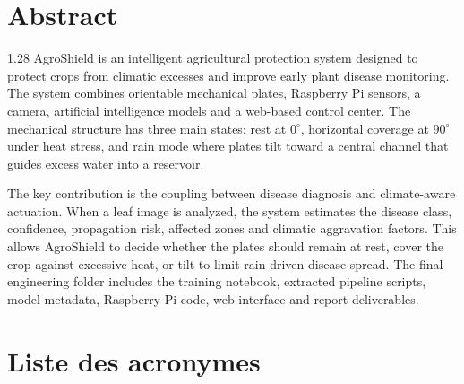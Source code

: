 ﻿\documentclass[11pt,a4paper,openany]{report}
\newenvironment{frontmattertext}
  {\begin{spacing}{1.28}\normalsize\setlength{\parskip}{10pt}}
  {\end{spacing}}
\begin{document}
\chapter*{Abstract}
\vspace{0.35cm}
\begin{frontmattertext}
AgroShield is an intelligent agricultural protection system designed to protect crops from climatic excesses and improve early plant disease monitoring. The system combines orientable mechanical plates, Raspberry Pi sensors, a camera, artificial intelligence models and a web-based control center. The mechanical structure has three main states: rest at \(0^\circ\), horizontal coverage at \(90^\circ\) under heat stress, and rain mode where plates tilt toward a central channel that guides excess water into a reservoir.

The key contribution is the coupling between disease diagnosis and climate-aware actuation. When a leaf image is analyzed, the system estimates the disease class, confidence, propagation risk, affected zones and climatic aggravation factors. This allows AgroShield to decide whether the plates should remain at rest, cover the crop against excessive heat, or tilt to limit rain-driven disease spread. The final engineering folder includes the training notebook, extracted pipeline scripts, model metadata, Raspberry Pi code, web interface and report deliverables.
\end{frontmattertext}

\chapter*{Liste des acronymes}

\renewcommand{\arraystretch}{1.25}
\end{document}
